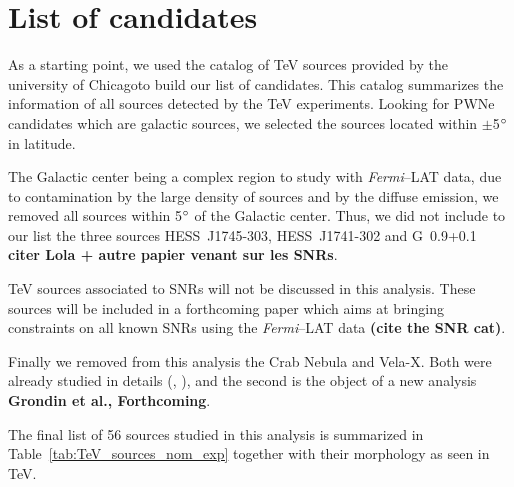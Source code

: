 \section{List of candidates}
As a starting point, we used the catalog of TeV sources provided by the university of Chicago\footnotemark[1] to build our list of candidates. This catalog summarizes the information of all sources detected by the TeV experiments. Looking for PWNe candidates which are galactic sources, we selected the sources located within $\pm$5$\mbox{$^\circ$}$ in latitude.

The Galactic center being a complex region to study with \emph{Fermi}--LAT data, due to contamination by the large density of sources and by the diffuse emission, we removed all sources within 5$\mbox{$^\circ$}$ of the Galactic center. Thus, we did not include to our list the three sources HESS~J1745-303, HESS~J1741-302 and G~0.9+0.1 \textbf{citer Lola + autre papier venant sur les SNRs}.

TeV sources associated to SNRs will not be discussed in this analysis. These sources will be included in a forthcoming paper which aims at bringing constraints on all known SNRs using the \emph{Fermi}--LAT data \textbf{(cite the SNR cat)}.

Finally we removed from this analysis the Crab Nebula and Vela-X. Both were already studied in details (\cite{2010ApJ...708.1254A}, \cite{2012ApJ...749...26B}), and the second is the object of a new analysis \textbf{Grondin et al., Forthcoming}. 

The final list of 56 sources studied in this analysis is summarized in Table~\ref{tab:TeV_sources_nom_exp} together with their morphology as seen in TeV. 
